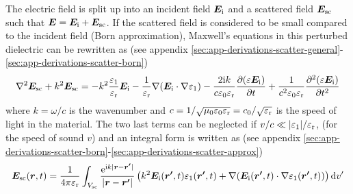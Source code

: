 \documentclass[11pt,twoside]{eitExjobb}
\begin{document}
	The electric field is split up into an incident field $\bm{E}_{\mathrm{i}}$ and a scattered field $\bm{E}_{\mathrm{sc}}$ such that $\bm{E} = \bm{E}_{\mathrm{i}} + \bm{E}_{\mathrm{sc}}$. If the scattered field is considered to be small compared to the incident field (Born approximation), Maxwell's equations in this perturbed dielectric can be rewritten as (see appendix \ref{sec:app-derivations-scatter-general}-\ref{sec:app-derivations-scatter-born})
	\begin{equation*}
		\nabla^2\bm{E}_{\mathrm{sc}} + k^2 \bm{E}_{\mathrm{sc}} =	-k^2 \frac{\varepsilon_1}{\varepsilon_{\mathrm{r}}} \bm{E}_{\mathrm{i}} -\frac{1}{\varepsilon_{\mathrm{r}}}\nabla(\bm{E}_{\mathrm{i}} \cdot \nabla \varepsilon_1) - \frac{2\mathrm{i} k}{c\varepsilon_0\varepsilon_{\mathrm{r}}} \frac{\partial (\varepsilon \bm{E}_{\mathrm{i}})}{\partial t} + \frac{1}{c^2 \varepsilon_0 \varepsilon_{\mathrm{r}}} \frac{\partial^2 (\varepsilon \bm{E}_{\mathrm{i}})}{\partial t^2}
	\end{equation*}
	where $k = \omega/c$ is the wavenumber and $c = 1/\sqrt{\mu_0 \varepsilon_0 \varepsilon_{\mathrm{r}}} = c_0/\sqrt{\varepsilon_{\mathrm{r}}}$ is the speed of light in the material. The two last terms can be neglected if $v/c \ll |\varepsilon_1|/\varepsilon_{\mathrm{r}}$, (for the speed of sound $v$) and an integral form is written as (see appendix \ref{sec:app-derivations-scatter-born}-\ref{sec:app-derivations-scatter-approx})
	\begin{equation}
		\bm{E}_{\mathrm{sc}}(\bm{r},t) = \frac{1}{4\pi\varepsilon_{\mathrm{r}}} \int_{V_{\mathrm{sc}}} \frac{\mathrm{e}^{\mathrm{i} k |\bm{r}-\bm{r'}| }}{ |\bm{r}-\bm{r'}|} \left( k^2 \bm{E}_{\mathrm{i}} (\bm{r'},t) \varepsilon_1 (\bm{r'},t) + \nabla (\bm{E}_{\mathrm{i}} (\bm{r'},t) \cdot \nabla \varepsilon_1 (\bm{r'},t)) \right) \mathrm{d}v'
		\label{eq:an-scatter-int}
	\end{equation}
	
\end{document}
